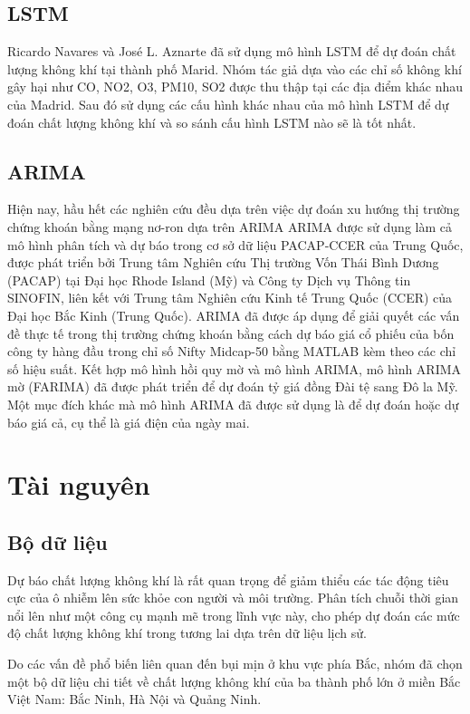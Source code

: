 \documentclass[conference]{IEEEtran}
\begin{document}
\subsection{LSTM}
Ricardo Navares và José L. Aznarte đã sử dụng mô hình LSTM để dự đoán chất lượng không khí tại thành phố Marid. Nhóm tác giả dựa vào các chỉ số không khí gây hại như CO, NO2, O3, PM10, SO2 được thu thập tại các địa điểm khác nhau của Madrid. Sau đó sử dụng các cấu hình khác nhau của mô hình LSTM để dự đoán chất lượng không khí và so sánh cấu hình LSTM nào sẽ là tốt nhất. \cite{b12}

\subsection{ARIMA}
Hiện nay, hầu hết các nghiên cứu đều dựa trên việc dự đoán xu hướng thị trường chứng khoán bằng mạng nơ-ron dựa trên ARIMA \cite{b13} ARIMA được sử dụng làm cả mô hình phân tích và dự báo trong cơ sở dữ liệu PACAP‐CCER của Trung Quốc, được phát triển bởi Trung tâm Nghiên cứu Thị trường Vốn Thái Bình Dương (PACAP) tại Đại học Rhode Island (Mỹ) và Công ty Dịch vụ Thông tin SINOFIN, liên kết với Trung tâm Nghiên cứu Kinh tế Trung Quốc (CCER) của Đại học Bắc Kinh (Trung Quốc). \cite{b14} ARIMA đã được áp dụng để giải quyết các vấn đề thực tế trong thị trường chứng khoán bằng cách dự báo giá cổ phiếu của bốn công ty hàng đầu trong chỉ số Nifty Midcap-50 bằng MATLAB kèm theo các chỉ số hiệu suất. \cite{b15} Kết hợp mô hình hồi quy mờ và mô hình ARIMA, mô hình ARIMA mờ (FARIMA) đã được phát triển để dự đoán tỷ giá đồng Đài tệ sang Đô la Mỹ. \cite{b16} Một mục đích khác mà mô hình ARIMA đã được sử dụng là để dự đoán hoặc dự báo giá cả, cụ thể là giá điện của ngày mai.

\section{Tài nguyên}
\subsection{Bộ dữ liệu}
Dự báo chất lượng không khí là rất quan trọng để giảm thiểu các tác động tiêu cực của ô nhiễm lên sức khỏe con người và môi trường. Phân tích chuỗi thời gian nổi lên như một công cụ mạnh mẽ trong lĩnh vực này, cho phép dự đoán các mức độ chất lượng không khí trong tương lai dựa trên dữ liệu lịch sử.

Do các vấn đề phổ biến liên quan đến bụi mịn ở khu vực phía Bắc, nhóm đã chọn một bộ dữ liệu chi tiết về chất lượng không khí của ba thành phố lớn ở miền Bắc Việt Nam: Bắc Ninh, Hà Nội và Quảng Ninh.
\end{document}
